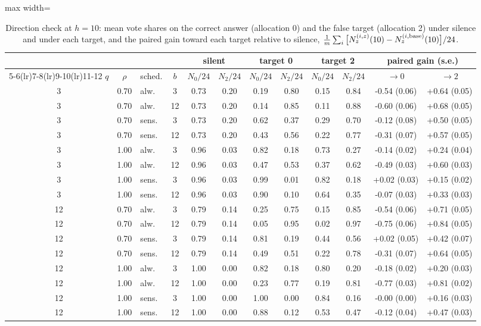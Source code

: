 \begin{table}[htbp]
\centering
\scriptsize
\caption{Direction check at $h=10$: mean vote shares on the correct answer (allocation 0) and the false target (allocation 2) under silence and under each target, and the paired gain toward each target relative to silence, $\frac1m\sum_i\big[N_z^{(i,z)}(10)-N_z^{(i,\rm base)}(10)\big]/24$.}\label{tab:direction}
\begin{adjustbox}{max width=\textwidth}
\begin{tabular}{cclc cc cc cc cc}
\toprule
\multicolumn{4}{c}{} & \multicolumn{2}{c}{silent} & \multicolumn{2}{c}{target 0} & \multicolumn{2}{c}{target 2} & \multicolumn{2}{c}{paired gain (s.e.)} \\ \cmidrule(lr){5-6}\cmidrule(lr){7-8}\cmidrule(lr){9-10}\cmidrule(lr){11-12}
$q$ & $\rho$ & sched. & $b$ & $N_0/24$ & $N_2/24$ & $N_0/24$ & $N_2/24$ & $N_0/24$ & $N_2/24$ & $\to 0$ & $\to 2$ \\
\midrule
3 & 0.70 & alw. & 3 & 0.73 & 0.20 & 0.19 & 0.80 & 0.15 & 0.84 & -0.54 (0.06) & +0.64 (0.05) \\
3 & 0.70 & alw. & 12 & 0.73 & 0.20 & 0.14 & 0.85 & 0.11 & 0.88 & -0.60 (0.06) & +0.68 (0.05) \\
3 & 0.70 & sens. & 3 & 0.73 & 0.20 & 0.62 & 0.37 & 0.29 & 0.70 & -0.12 (0.08) & +0.50 (0.05) \\
3 & 0.70 & sens. & 12 & 0.73 & 0.20 & 0.43 & 0.56 & 0.22 & 0.77 & -0.31 (0.07) & +0.57 (0.05) \\
3 & 1.00 & alw. & 3 & 0.96 & 0.03 & 0.82 & 0.18 & 0.73 & 0.27 & -0.14 (0.02) & +0.24 (0.04) \\
3 & 1.00 & alw. & 12 & 0.96 & 0.03 & 0.47 & 0.53 & 0.37 & 0.62 & -0.49 (0.03) & +0.60 (0.03) \\
3 & 1.00 & sens. & 3 & 0.96 & 0.03 & 0.99 & 0.01 & 0.82 & 0.18 & +0.02 (0.03) & +0.15 (0.02) \\
3 & 1.00 & sens. & 12 & 0.96 & 0.03 & 0.90 & 0.10 & 0.64 & 0.35 & -0.07 (0.03) & +0.33 (0.03) \\
12 & 0.70 & alw. & 3 & 0.79 & 0.14 & 0.25 & 0.75 & 0.15 & 0.85 & -0.54 (0.06) & +0.71 (0.05) \\
12 & 0.70 & alw. & 12 & 0.79 & 0.14 & 0.05 & 0.95 & 0.02 & 0.97 & -0.75 (0.06) & +0.84 (0.05) \\
12 & 0.70 & sens. & 3 & 0.79 & 0.14 & 0.81 & 0.19 & 0.44 & 0.56 & +0.02 (0.05) & +0.42 (0.07) \\
12 & 0.70 & sens. & 12 & 0.79 & 0.14 & 0.49 & 0.51 & 0.22 & 0.78 & -0.31 (0.07) & +0.64 (0.05) \\
12 & 1.00 & alw. & 3 & 1.00 & 0.00 & 0.82 & 0.18 & 0.80 & 0.20 & -0.18 (0.02) & +0.20 (0.03) \\
12 & 1.00 & alw. & 12 & 1.00 & 0.00 & 0.23 & 0.77 & 0.19 & 0.81 & -0.77 (0.03) & +0.81 (0.02) \\
12 & 1.00 & sens. & 3 & 1.00 & 0.00 & 1.00 & 0.00 & 0.84 & 0.16 & -0.00 (0.00) & +0.16 (0.03) \\
12 & 1.00 & sens. & 12 & 1.00 & 0.00 & 0.88 & 0.12 & 0.53 & 0.47 & -0.12 (0.04) & +0.47 (0.03) \\
\bottomrule
\end{tabular}
\end{adjustbox}
\end{table}